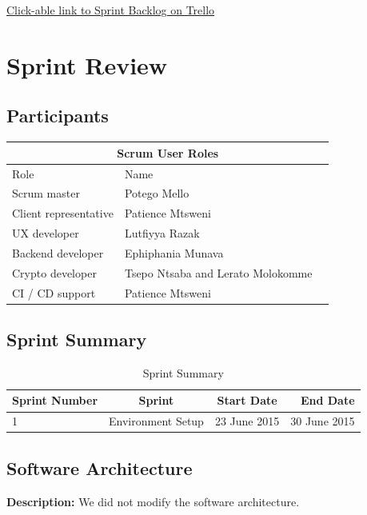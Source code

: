 \documentclass[a4paper]{article}
\begin{document}
\href{https://trello.com/b/hBJF6EUd}{Click-able link to Sprint Backlog on Trello}
\newpage

\section{Sprint Review}

\subsection{Participants}

\setlength{\arrayrulewidth}{1mm}
\setlength{\tabcolsep}{18pt}
\renewcommand{\arraystretch}{2.5} 
{
\begin{tabular}{ |p{3cm}|p{3cm}|p{3cm}|  }
\hline
\multicolumn{3}{|c|}{Scrum User Roles} \\
\hline
Role & Name\\
\hline
Scrum master  & Potego Mello\\
Client representative  & Patience Mtsweni\\
UX developer  & Lutfiyya Razak\\
Backend developer  & Ephiphania Munava\\
Crypto developer  & Tsepo Ntsaba and Lerato Molokomme\\
CI / CD support  & Patience Mtsweni \\ 
\hline
\end{tabular}
}


\subsection{Sprint Summary}
\begin{table}[h]
\centering
\caption{Sprint Summary}
\begin{tabular}{| l | c | c | r |}
\hline
Sprint Number & Sprint & Start Date & End Date\\ \hline
1 & Environment Setup & 23 June 2015 & 30 June 2015 \\
\hline
\end{tabular}
\end{table}


\subsection{Software Architecture}
\textbf{Description: }We did not modify the software architecture. \\
\end{document}
